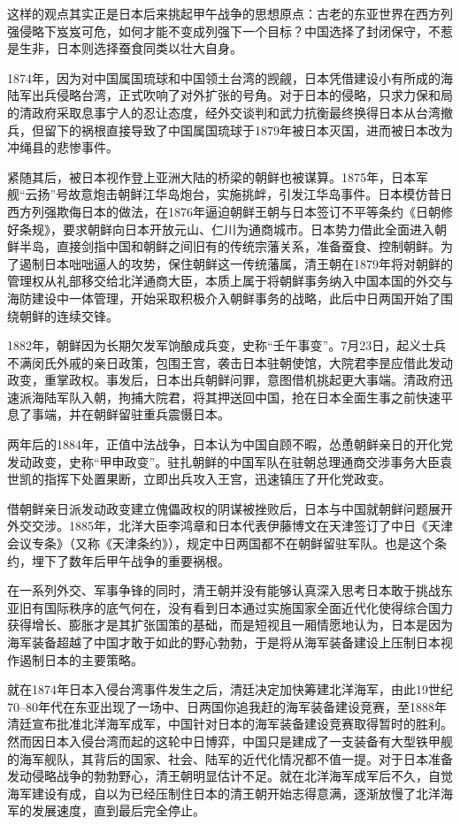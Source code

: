 \documentclass[12pt,UTF8]{ctexbook}
\begin{document}
这样的观点其实正是日本后来挑起甲午战争的思想原点：古老的东亚世界在西方列强侵略下岌岌可危，如何才能不变成列强下一个目标？中国选择了封闭保守，不惹是生非，日本则选择蚕食同类以壮大自身。

1874年，因为对中国属国琉球和中国领土台湾的觊觎，日本凭借建设小有所成的海陆军出兵侵略台湾，正式吹响了对外扩张的号角。对于日本的侵略，只求力保和局的清政府采取息事宁人的忍让态度，经外交谈判和武力抗衡最终换得日本从台湾撤兵，但留下的祸根直接导致了中国属国琉球于1879年被日本灭国，进而被日本改为冲绳县的悲惨事件。

紧随其后，被日本视作登上亚洲大陆的桥梁的朝鲜也被谋算。1875年，日本军舰“云扬”号故意炮击朝鲜江华岛炮台，实施挑衅，引发江华岛事件。日本模仿昔日西方列强欺侮日本的做法，在1876年逼迫朝鲜王朝与日本签订不平等条约《日朝修好条规》，要求朝鲜向日本开放元山、仁川为通商城市。日本势力借此全面进入朝鲜半岛，直接剑指中国和朝鲜之间旧有的传统宗藩关系，准备蚕食、控制朝鲜。为了遏制日本咄咄逼人的攻势，保住朝鲜这一传统藩属，清王朝在1879年将对朝鲜的管理权从礼部移交给北洋通商大臣，本质上属于将朝鲜事务纳入中国本国的外交与海防建设中一体管理，开始采取积极介入朝鲜事务的战略，此后中日两国开始了围绕朝鲜的连续交锋。

1882年，朝鲜因为长期欠发军饷酿成兵变，史称“壬午事变”。7月23日，起义士兵不满闵氏外戚的亲日政策，包围王宫，袭击日本驻朝使馆，大院君李昰应借此发动政变，重掌政权。事发后，日本出兵朝鲜问罪，意图借机挑起更大事端。清政府迅速派海陆军队入朝，拘捕大院君，将其押送回中国，抢在日本全面生事之前快速平息了事端，并在朝鲜留驻重兵震慑日本。

两年后的1884年，正值中法战争，日本认为中国自顾不暇，怂恿朝鲜亲日的开化党发动政变，史称“甲申政变”。驻扎朝鲜的中国军队在驻朝总理通商交涉事务大臣袁世凯的指挥下处置果断，立即出兵攻入王宫，迅速镇压了开化党政变。

借朝鲜亲日派发动政变建立傀儡政权的阴谋被挫败后，日本与中国就朝鲜问题展开外交交涉。1885年，北洋大臣李鸿章和日本代表伊藤博文在天津签订了中日《天津会议专条》（又称《天津条约》），规定中日两国都不在朝鲜留驻军队。也是这个条约，埋下了数年后甲午战争的重要祸根。

在一系列外交、军事争锋的同时，清王朝并没有能够认真深入思考日本敢于挑战东亚旧有国际秩序的底气何在，没有看到日本通过实施国家全面近代化使得综合国力获得增长、膨胀才是其扩张国策的基础，而是短视且一厢情愿地认为，日本是因为海军装备超越了中国才敢于如此的野心勃勃，于是将从海军装备建设上压制日本视作遏制日本的主要策略。

就在1874年日本入侵台湾事件发生之后，清廷决定加快筹建北洋海军，由此19世纪70--80年代在东亚出现了一场中、日两国你追我赶的海军装备建设竞赛，至1888年清廷宣布批准北洋海军成军，中国针对日本的海军装备建设竞赛取得暂时的胜利。然而因日本入侵台湾而起的这轮中日博弈，中国只是建成了一支装备有大型铁甲舰的海军舰队，其背后的国家、社会、陆军的近代化情况都不值一提。对于日本准备发动侵略战争的勃勃野心，清王朝明显估计不足。就在北洋海军成军后不久，自觉海军建设有成，自以为已经压制住日本的清王朝开始志得意满，逐渐放慢了北洋海军的发展速度，直到最后完全停止。
\end{document}
